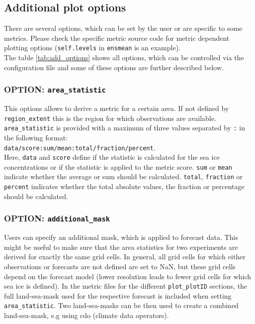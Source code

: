 \documentclass[DIV=10, parskip=full]{scrreprt}
\begin{document}
\subsection{Additional plot options}\label{subsec:add_options}
There are several options, which can be set by the user or are specific to some metrics. Please check the specific metric source code for metric dependent plotting options (\texttt{self.levels} in \texttt{ensmean} is an example).\\

The table \ref{tab:add_options} shows all options, which can be controlled via the configuration file and some of these options are further described below.

\subsubsection{OPTION: \texttt{area\_statistic}}
This options allows to derive a metric for a certain area. If not defined by \texttt{region\_extent} this is the region for which observations are available. \texttt{area\_statistic} is provided with a maximum of three values separated by \texttt{:} in the following format: \\

\texttt{data/score:sum/mean:total/fraction/percent}. \\

Here, \texttt{data} and \texttt{score} define if the statistic is calculated for the sea ice concentrations or if the statistic is applied to the metric score. \texttt{sum} or \texttt{mean} indicate whether the average or sum should be calculated. \texttt{total}, \texttt{fraction} or \texttt{percent} indicates whether the total absolute values, the fraction or percentage should be calculated.

\subsubsection{OPTION: \texttt{additional\_mask}}
Users can specify an additional mask, which is applied to forecast data. This might be useful to make sure that the area statistics for two experiments are derived for exactly the same grid cells. In general, all grid cells for which either observations or forecasts are not defined are set to NaN, but these grid cells depend on the forecast model (lower resolution leads to fewer grid cells for which sea ice is defined). In the metric files for the different \texttt{plot\_plotID} sections, the full land-sea-mask used for the respective forecast is included when setting \texttt{area\_statistic}. Two land-sea-masks can be then used to create a combined land-sea-mask, e.g using cdo (climate data operators).\\
\end{document}
